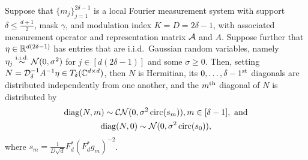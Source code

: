 \begin{proposition}
  Suppose that $\{m_j\}_{j = 1}^{2 \delta - 1}$ is a local Fourier measurement system with support $\delta \le \frac{d + 1}{2}$, mask $\gamma$, and modulation index $K = D = 2 \delta - 1$, with associated measurement operator and representation matrix $\mathcal{A}$ and $A$.  Suppose further that $\eta \in \mathbb{R}^{d (2 \delta - 1)}$ has entries that are i.i.d.~Gaussian random variables, namely $\eta_j \overset{\text{i.i.d.}}{\sim} \mathcal{N}(0, \sigma^2)$ for $j \in [d (2 \delta - 1)]$ and some $\sigma \ge 0$.  Then, setting $N = \mathcal{D}_\delta^{-1} A^{-1} \eta \in T_\delta(\mathbb{C}^{d \times d})$, then $N$ is Hermitian, its $0, \ldots, \delta - 1^{\text{st}}$ diagonals are distributed  independently from one another, and the $m^{\text{th}}$ diagonal of $N$ is distributed by \begin{gather*} \diag(N, m) \sim \CN(0, \sigma^2 \circop(s_m)), m \in [\delta - 1], \ \text{and} \\ \diag(N, 0) \sim \Nc(0, \sigma^2 \circop(s_0)),\end{gather*} where $s_m = \frac{1}{D \sqrt{d}} F_d^* (F_d^* g_m)^{-2}$.%
  \label{prop:var_dist}
\end{proposition}

